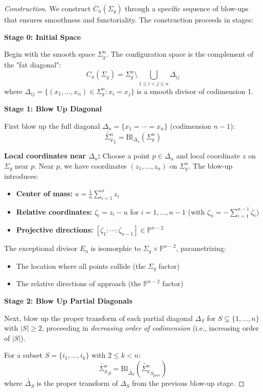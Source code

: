 \begin{proof}[Construction]
We construct $\overline{C}_n(\Sigma_g)$ through a specific sequence of blow-ups that ensures smoothness and functoriality. The construction proceeds in stages:

\medskip
\noindent\textbf{Stage 0: Initial Space}

Begin with the smooth space $\Sigma_g^n$. The configuration space is the complement of the "fat diagonal":
$$C_n(\Sigma_g) = \Sigma_g^n \setminus \bigcup_{1 \leq i < j \leq n} \Delta_{ij}$$
where $\Delta_{ij} = \{(x_1,\ldots,x_n) \in \Sigma_g^n : x_i = x_j\}$ is a smooth divisor of codimension 1.

\medskip
\noindent\textbf{Stage 1: Blow Up Diagonal}

First blow up the full diagonal $\Delta_n = \{x_1 = \cdots = x_n\}$ (codimension $n-1$):
$$\widetilde{\Sigma_g^n}_1 = \text{Bl}_{\Delta_n}(\Sigma_g^n)$$

\textbf{Local coordinates near $\Delta_n$:} Choose a point $p \in \Delta_n$ and local coordinate $z$ on $\Sigma_g$ near $p$. Near $p$, we have coordinates $(z_1,\ldots,z_n)$ on $\Sigma_g^n$. The blow-up introduces:
\begin{itemize}
\item \textbf{Center of mass:} $u = \frac{1}{n}\sum_{i=1}^n z_i$
\item \textbf{Relative coordinates:} $\zeta_i = z_i - u$ for $i = 1,\ldots,n-1$ (with $\zeta_n = -\sum_{i=1}^{n-1}\zeta_i$)
\item \textbf{Projective directions:} $[\zeta_1 : \cdots : \zeta_{n-1}] \in \mathbb{P}^{n-2}$
\end{itemize}

The exceptional divisor $E_n$ is isomorphic to $\Sigma_g \times \mathbb{P}^{n-2}$, parametrizing:
\begin{itemize}
\item The location where all points collide (the $\Sigma_g$ factor)
\item The relative directions of approach (the $\mathbb{P}^{n-2}$ factor)
\end{itemize}

\medskip
\noindent\textbf{Stage 2: Blow Up Partial Diagonals}

Next, blow up the proper transform of each partial diagonal $\Delta_S$ for $S \subsetneq \{1,\ldots,n\}$ with $|S| \geq 2$, proceeding in \emph{decreasing order of codimension} (i.e., increasing order of $|S|$).

For a subset $S = \{i_1, \ldots, i_k\}$ with $2 \leq k < n$:
$$\widetilde{\Sigma_g^n}_{S} = \text{Bl}_{\widetilde{\Delta_S}}(\widetilde{\Sigma_g^n}_{S_{\text{prev}}})$$
where $\widetilde{\Delta_S}$ is the proper transform of $\Delta_S$ from the previous blow-up stage.


\end{proof}
